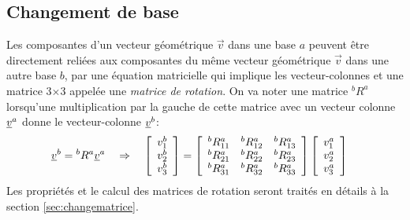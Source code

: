 \subsection{Changement de base}
%
Les composantes d'un vecteur géométrique $\vec{v}$ dans une base $a$ peuvent être directement reliées aux composantes du même vecteur géométrique $\vec{v}$ dans une autre base $b$, par une équation matricielle qui implique les vecteur-colonnes et une matrice 3$\times$3 appelée une \textit{matrice de rotation}. On va noter une matrice $^bR^a$ lorsqu'une multiplication par la gauche de cette matrice avec un vecteur colonne $\underline{v}^a$ donne le vecteur-colonne $\underline{v}^b$:
\begin{align}
\underline{v}^b &= {}^bR^a \underline{v}^a  \quad \Rightarrow \quad
 \left[ \begin{array}{c} v_1^b \\ v_2^b \\ v_3^b  \end{array} \right]
=
\left[ \begin{array}{c c c}
	{}^bR^a_{11} & {}^bR^a_{12} & {}^bR^a_{13} \\ 
	{}^bR^a_{21} & {}^bR^a_{22} & {}^bR^a_{23} \\
	{}^bR^a_{31} & {}^bR^a_{32} & {}^bR^a_{33}
\end{array}  \right]
 \left[ \begin{array}{c} v_1^a \\ v_2^a \\ v_3^a  \end{array} \right]
\label{eq:basechange1}
\end{align} 
Les propriétés et le calcul des matrices de rotation seront traités en détails à la section \ref{sec:changematrice}.



